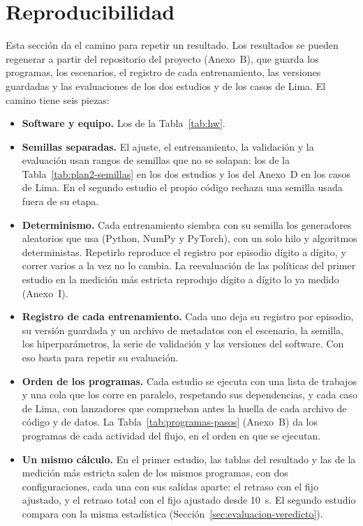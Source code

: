 \section{Reproducibilidad}
\label{sec:reproducibilidad}

Esta sección da el camino para repetir un resultado. Los resultados se
pueden regenerar a partir del repositorio del proyecto (Anexo~B), que
guarda los programas, los escenarios, el registro de cada
entrenamiento, las versiones guardadas y las evaluaciones de los dos
estudios y de los casos de Lima. El camino tiene seis piezas:

\begin{itemize}
  \item \textbf{Software y equipo.} Los de la Tabla~\ref{tab:hw}.
  \item \textbf{Semillas separadas.} El ajuste, el entrenamiento, la
    validación y la evaluación usan rangos de semillas que no se
    solapan: los de la Tabla~\ref{tab:plan2-semillas} en los dos
    estudios y los del Anexo~D en los casos de Lima. En el segundo
    estudio el propio código rechaza una semilla usada fuera de su
    etapa.
  \item \textbf{Determinismo.} Cada entrenamiento siembra con su
    semilla los generadores aleatorios que usa (Python, NumPy y
    PyTorch), con un solo hilo y algoritmos deterministas. Repetirlo
    reproduce el registro por episodio dígito a dígito, y correr varios
    a la vez no lo cambia. La reevaluación de las políticas del primer
    estudio en la medición más estricta reprodujo dígito a dígito lo ya
    medido (Anexo~I).
  \item \textbf{Registro de cada entrenamiento.} Cada uno deja su
    registro por episodio, su versión guardada y un archivo de
    metadatos con el escenario, la semilla, los hiperparámetros, la
    serie de validación y las versiones del software. Con eso basta
    para repetir su evaluación.
  \item \textbf{Orden de los programas.} Cada estudio se ejecuta con
    una lista de trabajos y una cola que los corre en paralelo,
    respetando sus dependencias, y cada caso de Lima, con lanzadores
    que comprueban antes la huella de cada archivo de código y de
    datos. La Tabla~\ref{tab:programas-pasos} (Anexo~B) da los
    programas de cada actividad del flujo, en el orden en que se
    ejecutan.
  \item \textbf{Un mismo cálculo.} En el primer estudio, las tablas del
    resultado y las de la medición más estricta salen de los mismos
    programas, con dos configuraciones, cada una con sus salidas
    aparte: el retraso con el fijo ajustado, y el retraso total con el
    fijo ajustado desde 10~s. El segundo estudio compara con la misma
    estadística (Sección~\ref{sec:evaluacion-veredicto}).
\end{itemize}
